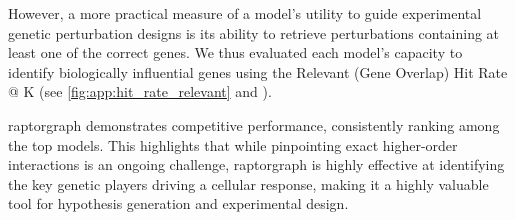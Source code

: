 However, a more practical measure of a model's utility to guide experimental genetic perturbation designs is its ability to retrieve perturbations containing at least one of the correct genes. We thus evaluated each model's capacity to identify biologically influential genes using the Relevant (Gene Overlap) Hit Rate @ K (see \cref{fig:app:hit_rate_relevant} and ).



\Gls{raptorgraph}  demonstrates competitive performance, consistently ranking among the top models.
This highlights that while pinpointing exact higher-order interactions is an ongoing challenge, \gls{raptorgraph} is highly effective at identifying the key genetic players driving a cellular response, making it a highly valuable tool for hypothesis generation and experimental design.
\begin{table}[htb]
\centering
\caption{
    Hit Rate @ K (relevant) for the reverse perturbation task.
    The metric measures the fraction of queries where at least one correct gene was identified in the top K predictions.
    Higher values are better.
}
\label{tab:hit_rate}
\vskip 0.15in
    \begin{center}
    \begin{small}
    \end{small}
    \end{center}
\vskip -0.1in
\end{table}


\section{}

